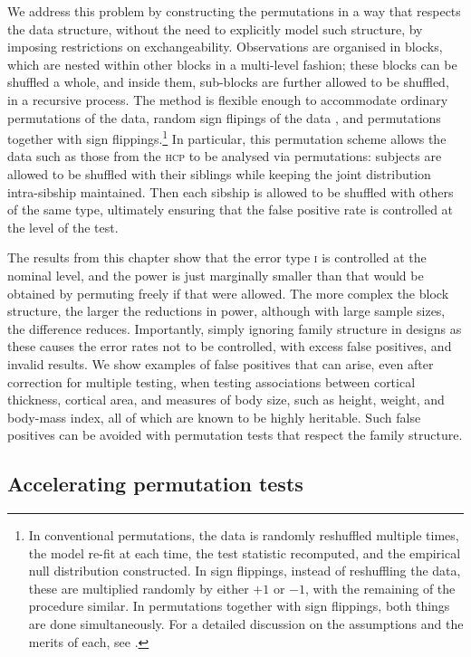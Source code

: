 We address this problem by constructing the permutations in a way that respects the data structure, without the need to explicitly model such structure, by imposing restrictions on exchangeability. Observations are organised in blocks, which are nested within other blocks in a multi-level fashion; these blocks can be shuffled a whole, and inside them, sub-blocks are further allowed to be shuffled, in a recursive process. The method is flexible enough to accommodate ordinary permutations of the data, random sign flipings of the data \citep[sometimes also called \emph{wild bootstrap};][]{Guillaume2014}, and permutations together with sign flippings.\footnote{In conventional permutations, the data is randomly reshuffled multiple times, the model re-fit at each time, the test statistic recomputed, and the empirical null distribution constructed. In sign flippings, instead of reshuffling the data, these are multiplied randomly by either $+1$ or $-1$, with the remaining of the procedure similar. In permutations together with sign flippings, both things are done simultaneously. For a detailed discussion on the assumptions and the merits of each, see \citep{Winkler2014}.} In particular, this permutation scheme allows the data such as those from the \textsc{hcp} to be analysed via permutations: subjects are allowed to be shuffled with their siblings while keeping the joint distribution intra-sibship maintained. Then each sibship is allowed to be shuffled with others of the same type, ultimately ensuring that the false positive rate is controlled at the level of the test.

The results from this chapter show that the error type \textsc{i} is controlled at the nominal level, and the power is just marginally smaller than that would be obtained by permuting freely if that were allowed. The more complex the block structure, the larger the reductions in power, although with large sample sizes, the difference reduces. Importantly, simply ignoring family structure in designs as these causes the error rates not to be controlled, with excess false positives, and invalid results. We show examples of false positives that can arise, even after correction for multiple testing, when testing associations between cortical thickness, cortical area, and measures of body size, such as height, weight, and body-mass index, all of which are known to be highly heritable. Such false positives can be avoided with permutation tests that respect the family structure.

\subsection{Accelerating permutation tests}

